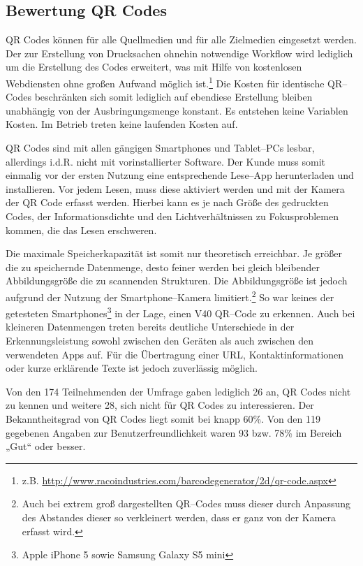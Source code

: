 \subsection{Bewertung QR Codes} %
\label{sub:bewertung_qr_codes}
QR Codes können für alle Quellmedien und für alle Zielmedien eingesetzt werden. Der zur Erstellung von Drucksachen ohnehin notwendige Workflow wird lediglich um die Erstellung des Codes erweitert, was mit Hilfe von kostenlosen Webdiensten ohne großen Aufwand möglich ist.\footnote{z.B. \url{http://www.racoindustries.com/barcodegenerator/2d/qr-code.aspx}} Die Kosten für identische QR–Codes beschränken sich somit lediglich auf ebendiese Erstellung bleiben unabhängig von der Ausbringungsmenge konstant. Es entstehen keine Variablen Kosten. Im Betrieb treten keine laufenden Kosten auf.

QR Codes sind mit allen gängigen Smartphones und Tablet–PCs lesbar, allerdings i.d.R. nicht mit vorinstallierter Software. Der Kunde muss somit einmalig vor der ersten Nutzung eine entsprechende Lese–App herunterladen und installieren. Vor jedem Lesen, muss diese aktiviert werden und mit der Kamera der QR Code erfasst werden. Hierbei kann es je nach Größe des gedruckten Codes, der Informationsdichte und den Lichtverhältnissen zu Fokusproblemen kommen, die das Lesen erschweren.   

Die maximale Speicherkapazität ist somit nur theoretisch erreichbar. Je größer die zu speichernde Datenmenge, desto feiner werden bei gleich bleibender Abbildungsgröße die zu scannenden Strukturen. Die Abbildungsgröße ist jedoch aufgrund der Nutzung der Smartphone–Kamera limitiert.\footnote{Auch bei extrem groß dargestellten QR–Codes muss dieser durch Anpassung des Abstandes dieser so verkleinert werden, dass er ganz von der Kamera erfasst wird.} So war keines der getesteten Smartphones\footnote{Apple iPhone 5 sowie Samsung Galaxy S5 mini} in der Lage, einen V40 QR–Code zu erkennen. Auch bei kleineren Datenmengen treten bereits deutliche Unterschiede in der Erkennungsleistung sowohl zwischen den Geräten als auch zwischen den verwendeten Apps auf. Für die Übertragung einer \ac{URL}, Kontaktinformationen oder kurze erklärende Texte ist jedoch zuverlässig möglich.

Von den 174 Teilnehmenden der Umfrage gaben lediglich 26 an, QR Codes nicht zu kennen und weitere 28, sich nicht für QR Codes zu interessieren. Der Bekanntheitsgrad von QR Codes liegt somit bei knapp 60\%. Von den 119 gegebenen Angaben zur Benutzerfreundlichkeit waren 93 bzw. 78\% im Bereich „Gut“ oder besser. 

